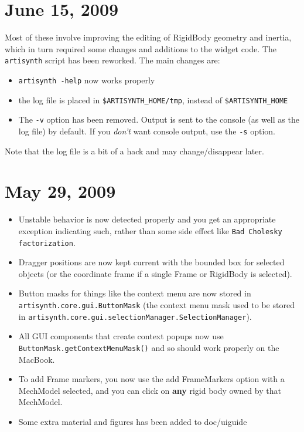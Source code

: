 \documentclass{article}
\begin{document}
\section*{June 15, 2009}

Most of these involve improving the editing of RigidBody geometry and 
inertia, which in turn required some changes and additions to the
widget code. The {\tt artisynth} script has been reworked. The main
changes are:

\begin{itemize}

\item {\tt artisynth -help} now works properly

\item the log file is placed in {\tt \$ARTISYNTH\_HOME/tmp}, instead of 
{\tt \$ARTISYNTH\_HOME}

\item The {\tt -v} option has been removed. Output is sent to the console (as 
well as the log file) by default. If you {\it don't} want console output, 
use the {\tt -s} option. 

\end{itemize}

Note that the log file is a bit of a hack and may change/disappear later.

\section*{May 29, 2009}

\begin{itemize}

\item Unstable behavior is now detected properly and you get an
appropriate exception indicating such, rather than some side effect 
like {\tt Bad Cholesky factorization}.

\item Dragger positions are now kept current with the bounded box for 
selected objects (or the coordinate frame if a single Frame or
RigidBody is selected).

\item Button masks for things like the context menu are now stored in 
{\tt artisynth.core.gui.ButtonMask} (the context menu mask used to be stored 
in {\tt artisynth.core.gui.selectionManager.SelectionManager}).

\item All GUI components that create context popups now use 
{\tt ButtonMask.getContextMenuMask()} and so should work properly on the 
MacBook.

\item To add Frame markers, you now use the {\sf add FrameMarkers} option 
with a MechModel selected, and you can click on {\bf any} rigid body 
owned by that MechModel.

\item Some extra material and figures has been added to doc/uiguide 

\end{itemize}
\end{document}
